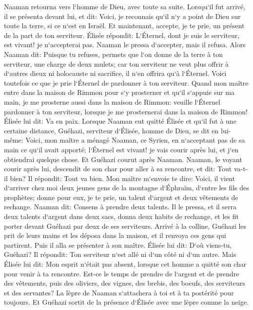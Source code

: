 \verse Naaman retourna vers l`homme de Dieu, avec toute sa suite. Lorsqu`il fut arrivé, il se présenta devant lui, et dit: Voici, je reconnais qu`il n`y a point de Dieu sur toute la terre, si ce n`est en Israël. Et maintenant, accepte, je te prie, un présent de la part de ton serviteur. 
\verse Élisée répondit: L`Éternel, dont je suis le serviteur, est vivant! je n`accepterai pas. Naaman le pressa d`accepter, mais il refusa. 
\verse Alors Naaman dit: Puisque tu refuses, permets que l`on donne de la terre à ton serviteur, une charge de deux mulets; car ton serviteur ne veut plus offrir à d`autres dieux ni holocauste ni sacrifice, il n`en offrira qu`à l`Éternel. 
\verse Voici toutefois ce que je prie l`Éternel de pardonner à ton serviteur. Quand mon maître entre dans la maison de Rimmon pour s`y prosterner et qu`il s`appuie sur ma main, je me prosterne aussi dans la maison de Rimmon: veuille l`Éternel pardonner à ton serviteur, lorsque je me prosternerai dans la maison de Rimmon! 
\verse Élisée lui dit: Va en paix. Lorsque Naaman eut quitté Élisée et qu`il fut à une certaine distance, 
\verse Guéhazi, serviteur d`Élisée, homme de Dieu, se dit en lui-même: Voici, mon maître a ménagé Naaman, ce Syrien, en n`acceptant pas de sa main ce qu`il avait apporté; l`Éternel est vivant! je vais courir après lui, et j`en obtiendrai quelque chose. 
\verse Et Guéhazi courut après Naaman. Naaman, le voyant courir après lui, descendit de son char pour aller à sa rencontre, et dit: Tout va-t-il bien? 
\verse Il répondit: Tout va bien. Mon maître m`envoie te dire: Voici, il vient d`arriver chez moi deux jeunes gens de la montagne d`Éphraïm, d`entre les fils des prophètes; donne pour eux, je te prie, un talent d`argent et deux vêtements de rechange. 
\verse Naaman dit: Consens à prendre deux talents. Il le pressa, et il serra deux talents d`argent dans deux sacs, donna deux habits de rechange, et les fit porter devant Guéhazi par deux de ses serviteurs. 
\verse Arrivé à la colline, Guéhazi les prit de leurs mains et les déposa dans la maison, et il renvoya ces gens qui partirent. 
\verse Puis il alla se présenter à son maître. Élisée lui dit: D`où viens-tu, Guéhazi? Il répondit: Ton serviteur n`est allé ni d`un côté ni d`un autre. 
\verse Mais Élisée lui dit: Mon esprit n`était pas absent, lorsque cet homme a quitté son char pour venir à ta rencontre. Est-ce le temps de prendre de l`argent et de prendre des vêtements, puis des oliviers, des vignes, des brebis, des boeufs, des serviteurs et des servantes? 
\verse La lèpre de Naaman s`attachera à toi et à ta postérité pour toujours. Et Guéhazi sortit de la présence d`Élisée avec une lèpre comme la neige. 

